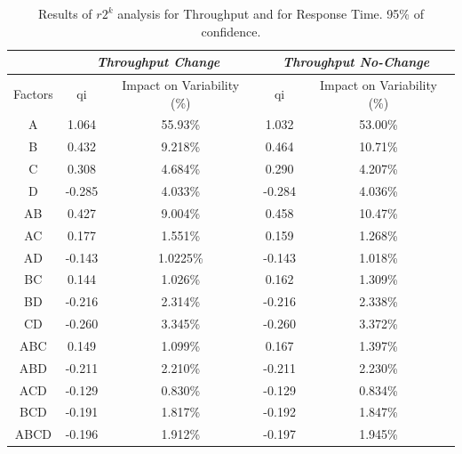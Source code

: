 \begin{table}[H]
	\centering
	\begin{tabular}{|c|c|c|c|c|}
		\hline
		\textbf{} & \multicolumn{2}{c|}{\textit{\textbf{Throughput Change}}} & \multicolumn{2}{c|}{\textit{\textbf{Throughput No-Change}}} \\ \hline
		Factors   & qi          & Impact on Variability (\%)          & qi            & Impact on Variability (\%)           \\ \hline
		A    & 1.064	& 55.93\% 	& 1.032 &	53.00\%  \\ \hline
		B    & 0.432 &	9.218\% &	0.464 &	10.71\%  \\ \hline
		C    & 0.308 & 4.684\% & 0.290 &	4.207\%  \\ \hline
		D    & -0.285 &	4.033\% & -0.284 &	4.036\%  \\ \hline
		AB   & 0.427 & 9.004\% & 0.458 &	10.47\%  \\ \hline
		AC   & 0.177 & 1.551\% & 0.159 &	1.268\%  \\ \hline
		AD   & -0.143 &	1.0225\% & -0.143 & 1.018\%  \\ \hline
		BC   & 0.144 & 1.026\% &	0.162 &	1.309\%  \\ \hline
		BD   & -0.216 &	2.314\% & -0.216 & 2.338\%  \\ \hline
		CD   & -0.260 & 3.345\% & -0.260 & 3.372\%  \\ \hline
		ABC  & 0.149 & 	1.099\% & 0.167 & 1.397\%  \\ \hline
		ABD  & -0.211 &	2.210\% & -0.211 & 2.230\%  \\ \hline
		ACD  & -0.129 &	0.830\% & -0.129 & 0.834\%  \\ \hline
		BCD  & -0.191 &	1.817\% & -0.192 & 1.847\%  \\ \hline
		ABCD & -0.196 &	1.912\% & -0.197 & 1.945\%  \\ \hline
	
	\end{tabular}
	\caption{Results of $r2^k$ analysis for Throughput and for Response Time. 95\% of confidence.}
	\label{tab: 2kr_results_explosion}
\end{table}


